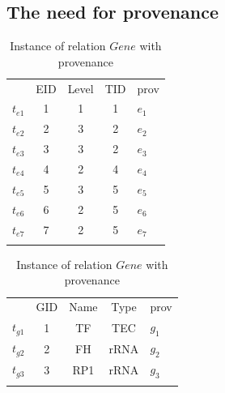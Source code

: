 \subsection{The need for provenance}
\label{ssec:need-provenance}


\begin{table}[htp]
\centering
\small
\caption{Instance of relation $Exon$ with provenance}\label{Instance of Exon}
\begin{tabular}[t]{c|c|c|c||b|} \hhline{~----}
&EID&Level&TID&prov\\ \hhline{~----}
$t_{e1}$&1&1&1&$e_1$\\ \hhline{~----}
$t_{e2}$&2&3&2&$e_2$\\ \hhline{~----}
$t_{e3}$&3&3&2&$e_3$\\ \hhline{~----}
$t_{e4}$&4&2&4&$e_4$\\ \hhline{~----}
$t_{e5}$&5&3&5&$e_5$\\ \hhline{~----}
$t_{e6}$&6&2&5&$e_6$\\ \hhline{~----}
$t_{e7}$&7&2&5&$e_7$\\ \hhline{~----}
\end{tabular}
\bigskip
\caption{Instance of relation $Gene$ with provenance}\label{Instance of Gene}
\begin{tabular}[t]{c|c|c|c||b|} \hhline{~----}
&GID&Name&Type&prov\\ \hhline{~----}
$t_{g1}$&1&TF&TEC&$g_1$\\ \hhline{~----}
$t_{g2}$&2&FH&rRNA&$g_2$\\ \hhline{~----}
$t_{g3}$&3&RP1&rRNA&$g_3$\\ \hhline{~----}

\end{tabular}
\end{table}
